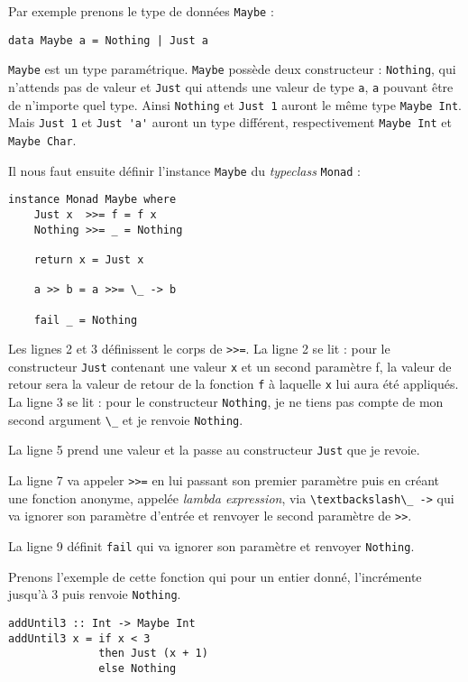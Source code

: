 \documentclass{llncs}
\begin{document}
Par exemple prenons le type de données \lstinline{Maybe} :
\begin{lstlisting}
data Maybe a = Nothing | Just a
\end{lstlisting}

\lstinline{Maybe} est un type paramétrique.
\lstinline{Maybe} possède deux constructeur : \lstinline{Nothing}, qui n'attends pas
de valeur et \lstinline{Just} qui attends une valeur de type \lstinline{a}, \lstinline{a}
pouvant être de n'importe quel type.
Ainsi \lstinline{Nothing} et \lstinline{Just 1} auront le même type \lstinline{Maybe Int}.
Mais \lstinline{Just 1} et \lstinline{Just 'a'} auront un type différent, respectivement
\lstinline{Maybe Int} et \lstinline{Maybe Char}.

Il nous faut ensuite définir l'instance \lstinline{Maybe} du \emph{typeclass}
\lstinline{Monad} :
\begin{lstlisting}
instance Monad Maybe where
    Just x  >>= f = f x
    Nothing >>= _ = Nothing

    return x = Just x

    a >> b = a >>= \_ -> b

    fail _ = Nothing
\end{lstlisting}

Les lignes 2 et 3 définissent le corps de \lstinline{>>=}.
La ligne 2 se lit : pour le constructeur \lstinline{Just} contenant une valeur
\lstinline{x} et un second paramètre f, la valeur de retour sera la valeur de retour
de la fonction \lstinline{f} à laquelle \lstinline{x} lui aura été appliqués.
La ligne 3 se lit : pour le constructeur \lstinline{Nothing}, je ne tiens pas compte
de mon second argument \lstinline{\_} et je renvoie \lstinline{Nothing}.

La ligne 5 prend une valeur et la passe au constructeur \lstinline{Just} que je revoie.

La ligne 7 va appeler \lstinline{>>=} en lui passant son premier paramètre puis en créant
une fonction anonyme, appelée \emph{lambda expression}, via \lstinline{\textbackslash\_ ->} qui
va ignorer son paramètre d'entrée et renvoyer le second paramètre de \lstinline{>>}.

La ligne 9 définit \lstinline{fail} qui va ignorer son paramètre et renvoyer \lstinline{Nothing}.

Prenons l'exemple de cette fonction qui pour un entier donné, l'incrémente jusqu'à
3 puis renvoie \lstinline{Nothing}.
\begin{lstlisting}
addUntil3 :: Int -> Maybe Int
addUntil3 x = if x < 3
              then Just (x + 1)
              else Nothing
\end{lstlisting}
\end{document}
